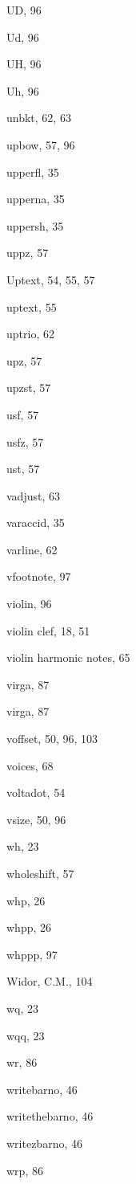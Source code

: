 \begin{theindex}
  \indexspace

  \item {\Bslash UD}, 96
  \item {\Bslash Ud}, 96
  \item {\Bslash UH}, 96
  \item {\Bslash Uh}, 96
  \item {\Bslash unbkt}, 62, 63
  \item {\Bslash upbow}, 57, 96
  \item {\Bslash upperfl}, 35
  \item {\Bslash upperna}, 35
  \item {\Bslash uppersh}, 35
  \item {\Bslash uppz}, 57
  \item {\Bslash Uptext}, 54, 55, 57
  \item {\Bslash uptext}, 55
  \item {\Bslash uptrio}, 62
  \item {\Bslash upz}, 57
  \item {\Bslash upzst}, 57
  \item {\Bslash usf}, 57
  \item {\Bslash usfz}, 57
  \item {\Bslash ust}, 57

  \indexspace

  \item {\Bslash vadjust}, 63
  \item {\Bslash varaccid}, 35
  \item {\Bslash varline}, 62
  \item {\Bslash vfootnote}, 97
  \item violin, 96
  \item violin clef, 18, 51
  \item violin harmonic notes, 65
  \item virga, 87
  \item {\Bslash virga}, 87
  \item {\Bslash voffset}, 50, 96, 103
  \item voices, 68
  \item {\Bslash voltadot}, 54
  \item {\Bslash vsize}, 50, 96

  \indexspace

  \item {\Bslash wh}, 23
  \item {\Bslash wholeshift}, 57
  \item {\Bslash whp}, 26
  \item {\Bslash whpp}, 26
  \item {\Bslash whppp}, 97
  \item {\sc Widor, C.M.}, 104
  \item {\Bslash wq}, 23
  \item {\Bslash wqq}, 23
  \item {\Bslash wr}, 86
  \item {\Bslash writebarno}, 46
  \item {\Bslash writethebarno}, 46
  \item {\Bslash writezbarno}, 46
  \item {\Bslash wrp}, 86


\end{theindex}
